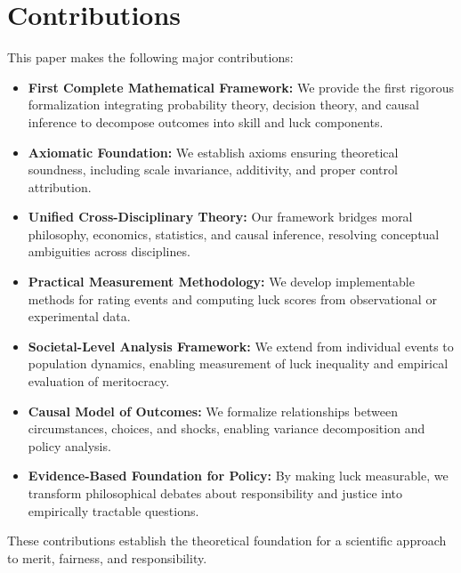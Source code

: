   \section{Contributions}
  \label{sec:contributions}

  This paper makes the following major contributions:

  \begin{itemize}
    \item \textbf{First Complete Mathematical Framework:}
      We provide the first rigorous formalization integrating probability theory,
      decision theory, and causal inference to decompose outcomes into skill
      and luck components.

    \item \textbf{Axiomatic Foundation:}
      We establish axioms ensuring theoretical soundness, including scale invariance,
      additivity, and proper control attribution.

    \item \textbf{Unified Cross-Disciplinary Theory:}
      Our framework bridges moral philosophy, economics, statistics, and causal
      inference, resolving conceptual ambiguities across disciplines.

    \item \textbf{Practical Measurement Methodology:}
      We develop implementable methods for rating events and computing luck scores
      from observational or experimental data.

    \item \textbf{Societal-Level Analysis Framework:}
      We extend from individual events to population dynamics, enabling measurement
      of luck inequality and empirical evaluation of meritocracy.

    \item \textbf{Causal Model of Outcomes:}
      We formalize relationships between circumstances, choices, and shocks,
      enabling variance decomposition and policy analysis.

    \item \textbf{Evidence-Based Foundation for Policy:}
      By making luck measurable, we transform philosophical debates about
      responsibility and justice into empirically tractable questions.
  \end{itemize}

  These contributions establish the theoretical foundation for a scientific
  approach to merit, fairness, and responsibility.

